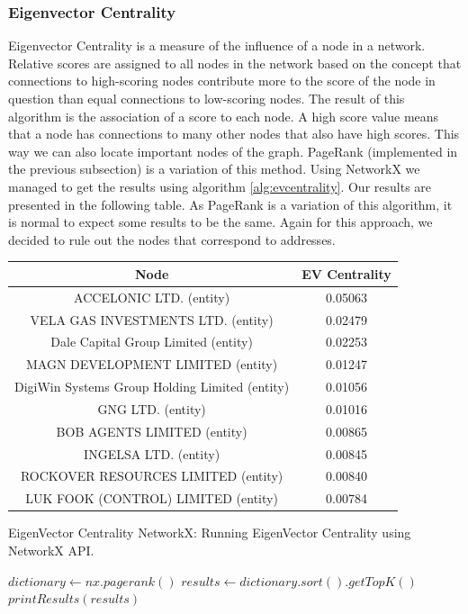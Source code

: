 \documentclass[sigconf, nonacm]{acmart}
\begin{document}
\subsubsection{Eigenvector Centrality}
Eigenvector Centrality is a measure of the influence of a node in a network. Relative scores are assigned to all nodes in the network based on the concept that connections to high-scoring nodes contribute more to the score of the node in question than equal connections to low-scoring nodes. The result of this algorithm is the association of a score to each node. A high score value means that a node has connections to many other nodes that also have high scores. This way we can also locate important nodes of the graph. PageRank (implemented in the previous subsection) is a variation of this method. Using NetworkX we managed to get the results using algorithm \ref{alg:evcentrality}. Our results are presented in the following table. As PageRank is a variation of this algorithm, it is normal to expect some results to be the same. Again for this approach, we decided to rule out the nodes that correspond to addresses.

\begin{center}
\begin{tabular}{||c | c||} 
 \hline
 Node & EV Centrality \\ [0.5ex] 
 \hline\hline
 ACCELONIC LTD. (entity) & 0.05063 \\ 
 \hline
VELA GAS INVESTMENTS LTD. (entity) & 0.02479 \\
 \hline
Dale Capital Group Limited (entity) & 0.02253 \\
 \hline
MAGN DEVELOPMENT LIMITED (entity) & 0.01247 \\
 \hline
DigiWin Systems Group Holding Limited (entity) & 0.01056 \\
 \hline
GNG LTD. (entity) & 0.01016 \\
 \hline
BOB AGENTS LIMITED (entity) & 0.00865 \\
 \hline
INGELSA LTD. (entity) & 0.00845 \\
 \hline
ROCKOVER RESOURCES LIMITED (entity) & 0.00840 \\
 \hline
LUK FOOK (CONTROL) LIMITED (entity) & 0.00784 \\
 \hline
\end{tabular}
\end{center}

\begin{algorithm}
\caption{EigenVector Centrality NetworkX: Running EigenVector Centrality using NetworkX API.}\label{alg:evcentrality}
\begin{algorithmic}

\State $dictionary \gets nx.pagerank()$
\State $results \gets dictionary.sort().getTopK()$
\State $printResults(results)$

\end{algorithmic}
\end{algorithm}
\end{document}
